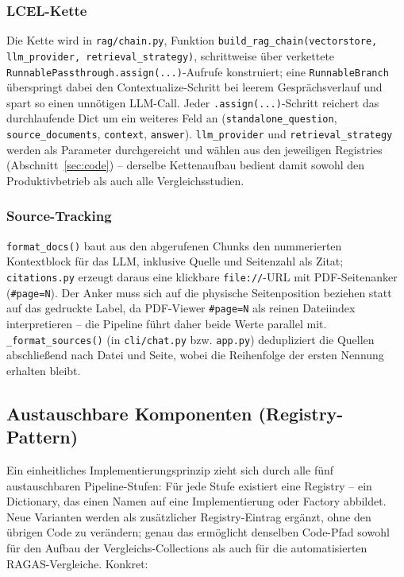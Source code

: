 \documentclass[11pt,a4paper]{article}
\begin{document}
\subsubsection{LCEL-Kette}

Die Kette wird in \texttt{rag/chain.py}, Funktion
\texttt{build\_rag\_chain(vectorstore, llm\_provider,
retrieval\_strategy)}, schrittweise über verkettete
\texttt{RunnablePassthrough.assign(...)}-Aufrufe konstruiert; eine
\texttt{RunnableBranch} überspringt dabei den Contextualize-Schritt bei
leerem Gesprächsverlauf und spart so einen unnötigen LLM-Call. Jeder
\texttt{.assign(...)}-Schritt reichert das durchlaufende Dict um ein
weiteres Feld an (\texttt{standalone\_question}, \texttt{source\_documents},
\texttt{context}, \texttt{answer}). \texttt{llm\_provider} und
\texttt{retrieval\_strategy} werden als Parameter durchgereicht und wählen
aus den jeweiligen Registries (Abschnitt~\ref{sec:code}) -- derselbe
Kettenaufbau bedient damit sowohl den Produktivbetrieb als auch alle
Vergleichsstudien.

\subsubsection{Source-Tracking}

\texttt{format\_docs()} baut aus den abgerufenen Chunks den nummerierten
Kontextblock für das LLM, inklusive Quelle und Seitenzahl als Zitat;
\texttt{citations.py} erzeugt daraus eine klickbare \texttt{file://}-URL
mit PDF-Seitenanker (\texttt{\#page=N}). Der Anker muss sich auf die
physische Seitenposition beziehen statt auf das gedruckte Label, da
PDF-Viewer \texttt{\#page=N} als reinen Dateiindex interpretieren -- die
Pipeline führt daher beide Werte parallel mit. \texttt{\_format\_sources()}
(in \texttt{cli/chat.py} bzw. \texttt{app.py}) dedupliziert die Quellen
abschließend nach Datei und Seite, wobei die Reihenfolge der ersten
Nennung erhalten bleibt.

\subsection{Austauschbare Komponenten (Registry-Pattern)}

Ein einheitliches Implementierungsprinzip zieht sich durch alle fünf
austauschbaren Pipeline-Stufen: Für jede Stufe existiert eine Registry --
ein Dictionary, das einen Namen auf eine Implementierung oder Factory
abbildet. Neue Varianten werden als zusätzlicher Registry-Eintrag ergänzt,
ohne den übrigen Code zu verändern; genau das ermöglicht denselben
Code-Pfad sowohl für den Aufbau der Vergleichs-Collections als auch für
die automatisierten RAGAS-Vergleiche. Konkret:
\end{document}
